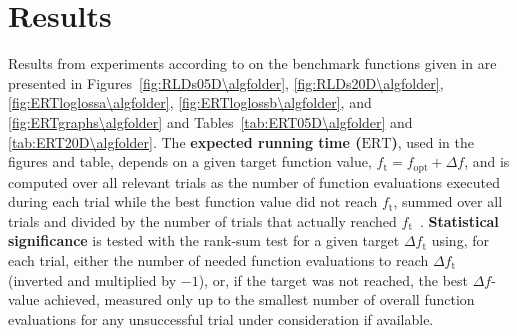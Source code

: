 \documentclass{article}
\newcommand{\ERT}{\ensuremath{\mathrm{ERT}}}
\newcommand{\Df}{\ensuremath{\Delta f}}
\newcommand{\fopt}{\ensuremath{f_\mathrm{opt}}}
\newcommand{\ftarget}{\ensuremath{f_\mathrm{t}}}
\begin{document}
\section{Results}
Results from experiments according to \cite{hansen2010exp} on the
benchmark functions given in \cite{wp200902_2010,hansen2010noi} are presented
in Figures~\ref{fig:RLDs05D\algfolder}, \ref{fig:RLDs20D\algfolder}, \ref{fig:ERTloglossa\algfolder}, \ref{fig:ERTloglossb\algfolder}, and \ref{fig:ERTgraphs\algfolder} and 
Tables~\ref{tab:ERT05D\algfolder} and \ref{tab:ERT20D\algfolder}.
The \textbf{expected running time (\ERT)}, used in the figures and table,
depends on a given target function value, $\ftarget=\fopt+\Df$, and is computed
over all relevant trials as the number of function evaluations executed during
each trial while the best function value did not reach \ftarget, summed over
all trials and divided by the number of trials that actually reached \ftarget\
\cite{hansen2010exp,price1997dev}.
\textbf{Statistical significance} is tested with the rank-sum test for a given
target $\Delta\ftarget$ using, for each trial, either the number of needed
function evaluations to reach $\Delta\ftarget$ (inverted and multiplied by
$-1$), or, if the target was not reached, the best $\Df$-value achieved,
measured only up to the smallest number of overall function evaluations for any
unsuccessful trial under consideration if available.
\end{document}
